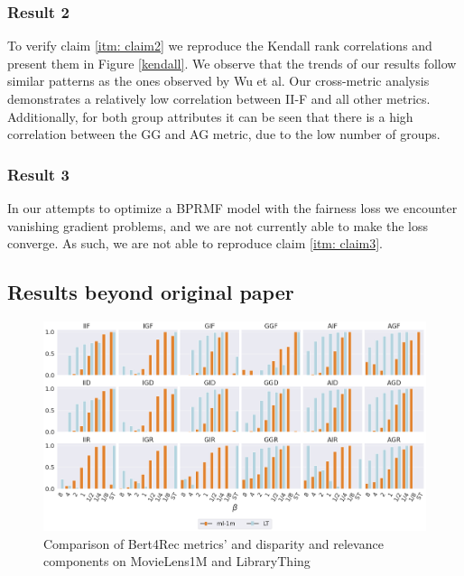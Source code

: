 \subsubsection{Result 2} 
To verify claim \ref{itm: claim2} we reproduce the Kendall rank correlations and present them in Figure \ref{kendall}. We observe that the trends of our results follow similar patterns as the ones observed by Wu et al. Our cross-metric analysis demonstrates a relatively low correlation between II-F and all other metrics. Additionally, for both group attributes it can be seen that there is a high correlation between the GG and AG metric, due to the low number of groups. 

\subsubsection{Result 3} 
In our attempts to optimize a BPRMF model with the fairness loss we encounter vanishing gradient problems, and we are not currently able to make the loss converge. As such, we are not able to reproduce claim \ref{itm: claim3}.

\newpage
\subsection{Results beyond original paper}
\begin{figure}[ht]
    \centering
    \includegraphics[width=\columnwidth]{Figures/Figure_5.png}
    \caption{Comparison of Bert4Rec metrics' and disparity and relevance components on MovieLens1M and LibraryThing}
    \label{bert_metrics}
\end{figure}
